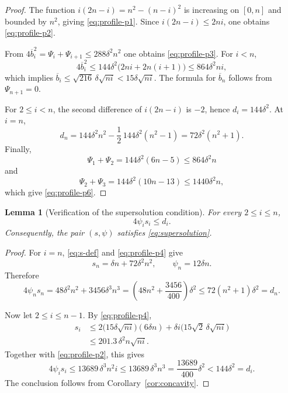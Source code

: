 \documentclass[11pt]{amsart}
\numberwithin{equation}{section}
\newtheorem{lemma}[lemma]{Lemma}
\theoremstyle{remark}
\begin{document}
\begin{proof}
The function $i(2n-i)=n^2-(n-i)^2$ is increasing on $[0,n]$ and bounded by
$n^2$, giving \eqref{eq:profile-p1}.  Since
$i(2n-i)\leq2ni$, one obtains \eqref{eq:profile-p2}.

From $4\overline b_i^2=\Psi_i+\Psi_{i+1}\leq288\delta^2n^2$ one obtains
\eqref{eq:profile-p3}.  For $i<n$,
\[
 4\overline b_i^2
 \leq144\delta^2\bigl(2ni+2n(i+1)\bigr)
 \leq864\delta^2ni,
\]
which implies $\overline b_i\leq\sqrt{216}\,\delta\sqrt{ni}<15\delta\sqrt{ni}$.
The formula for $\overline b_n$ follows from $\Psi_{n+1}=0$.

For $2\leq i<n$, the second difference of $i(2n-i)$ is $-2$, hence
$d_i=144\delta^2$.  At $i=n$,
\[
 d_n
 =144\delta^2n^2-\frac12\,144\delta^2(n^2-1)
 =72\delta^2(n^2+1).
\]
Finally,
\[
 \Psi_1+\Psi_2=144\delta^2(6n-5)
 \leq864\delta^2n
\]
and
\[
 \Psi_2+\Psi_3=144\delta^2(10n-13)
 \leq1440\delta^2n,
\]
which give \eqref{eq:profile-p6}.
\end{proof}

\begin{lemma}[Verification of the supersolution condition]\label{lem:profile-super}
For every $2\leq i\leq n$,
\begin{equation}\label{eq:profile-super}
 4\psi_i s_i\leq d_i.
\end{equation}
Consequently, the pair $(s,\psi)$ satisfies
\eqref{eq:supersolution}.
\end{lemma}

\begin{proof}
For $i=n$, \eqref{eq:s-def} and \eqref{eq:profile-p4} give
\[
 s_n=\delta n+72\delta^2n^2,
 \qquad
 \psi_n=12\delta n.
\]
Therefore
\[
 4\psi_ns_n
 =48\delta^2n^2+3456\delta^3n^3
 =\left(48n^2+\frac{3456}{400}\right)\delta^2
 \leq72(n^2+1)\delta^2=d_n.
\]

Now let $2\leq i\leq n-1$.  By
\eqref{eq:profile-p4},
\begin{align*}
 s_i
 &\leq2\bigl(15\delta\sqrt{ni}\bigr)(6\delta n)
 +\delta i\bigl(15\sqrt2\,\delta\sqrt{ni}\bigr)\\
 &\leq201.3\,\delta^2n\sqrt{ni}.
\end{align*}
Together with \eqref{eq:profile-p2}, this gives
\[
 4\psi_i s_i
 \leq13689\,\delta^3n^2i
 \leq13689\,\delta^3n^3
 =\frac{13689}{400}\delta^2
 <144\delta^2=d_i.
\]
The conclusion follows from Corollary~\ref{cor:concavity}.
\end{proof}
\end{document}
